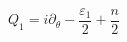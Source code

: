 \begin{equation}
Q_1 = i\partial_\theta -\frac{\varepsilon_1}{2}+ \frac{n}{2}
\label{Q1}
\end{equation} 
